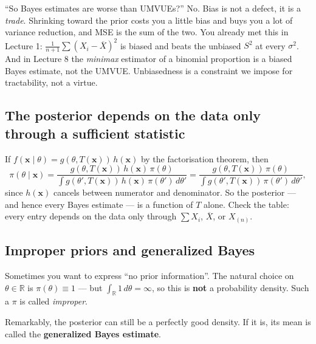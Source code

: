 \documentclass[11pt]{article}
\newcommand{\R}{\mathbb{R}}
\newcommand{\Xbar}{\overline{X}}
\begin{document}
\begin{confusion}{``So Bayes estimates are worse than UMVUEs?''}
No. Bias is not a defect, it is a \emph{trade}. Shrinking toward the prior costs you a little
bias and buys you a lot of variance reduction, and MSE is the sum of the two. You already met
this in Lecture 1: $\frac{1}{n+1}\sum(X_i-\Xbar)^2$ is biased and beats the unbiased $S^2$ at
every $\sigma^2$. And in Lecture 8 the \emph{minimax} estimator of a binomial proportion is a
biased Bayes estimate, not the UMVUE. Unbiasedness is a constraint we impose for
tractability, not a virtue.
\end{confusion}

\subsection{The posterior depends on the data only through a sufficient statistic}

If $f(\mathbf x\mid\theta)=g(\theta,T(\mathbf x))\,h(\mathbf x)$ by the factorisation theorem,
then
\[
\pi(\theta\mid\mathbf x)=\frac{g(\theta,T(\mathbf x))\,h(\mathbf x)\,\pi(\theta)}
{\int g(\theta',T(\mathbf x))\,h(\mathbf x)\,\pi(\theta')\,d\theta'}
=\frac{g(\theta,T(\mathbf x))\,\pi(\theta)}{\int g(\theta',T(\mathbf x))\,\pi(\theta')\,d\theta'} ,
\]
since $h(\mathbf x)$ cancels between numerator and denominator. So the posterior --- and hence
every Bayes estimate --- is a function of $T$ alone. Check the table: every entry depends on
the data only through $\sum X_i$, $\Xbar$, or $X_{(n)}$. \checkmark

\subsection{Improper priors and generalized Bayes}

Sometimes you want to express ``no prior information''. The natural choice on $\theta\in\R$ is
$\pi(\theta)\equiv1$ --- but $\int_\R 1\,d\theta=\infty$, so this is \textbf{not} a probability
density. Such a $\pi$ is called \emph{improper}.

Remarkably, the posterior can still be a perfectly good density. If it is, its mean is called
the \textbf{generalized Bayes estimate}.
\end{document}
